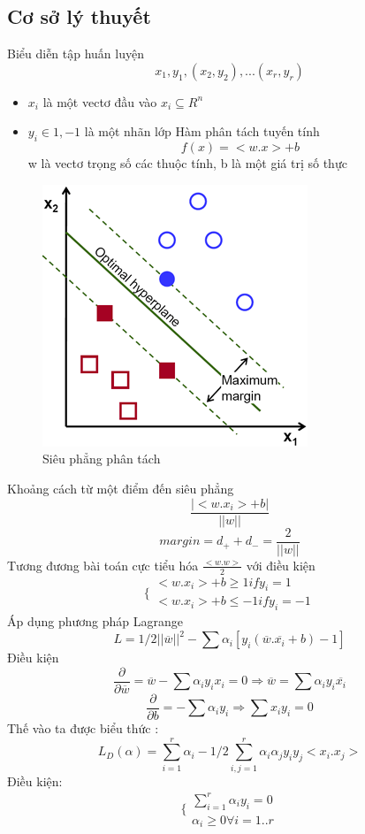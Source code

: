 \documentclass[a4paper,12pt]{report}
\begin{document}
\subsection{Cơ sở lý thuyết}
Biểu diễn tập huấn luyện 
$${x_1, y_1}, (x_2,y_2),...(x_r,y_r)$$
\begin{itemize}
\item $x_i$ là một vectơ đầu vào $x_i \subseteq R^n$
\item $y_i\in{1,-1}$ là một nhãn lớp
Hàm phân tách tuyến tính 
$$f(x)=<w.x> +b$$
w là vectơ trọng số các thuộc tính, b là một giá trị số thực\\


\end{itemize}
\begin{figure}[H]
\centering
\includegraphics[scale=3.0]{margin-svm.png}
\caption{Siêu phẳng phân tách}
\label{fig:margin-svm}
\end{figure}
Khoảng cách từ một điểm đến siêu phẳng 
$$\frac{|<w.x_i>+b|}{||w||} $$
$$margin=d_+ +d_-=\frac{2}{||w||}$$ 
Tương đương bài toán cực tiểu hóa $\frac{<w.w>}{2}$ với điều kiện 
$$ \lbrace\begin{array}{l}
 <w.x_i>+b \geq 1 if y_i=1\\ <w.x_i>+b
    \leq -1  if y_i=-1 \end{array} $$
Áp dụng phương pháp Lagrange  
$$ L= 1/2 ||\overline{w}||^2 -\sum\alpha_i[y_i(\overline{w}.\overline{x_i} +b)-1] $$
Điều kiện 
$$ \frac{ \partial}{\partial\overline{w}}
=\overline{w}- \sum \alpha_i y_i x_i=0 \Longrightarrow \overline{w}=\sum \alpha_i y_i \overline{x_i} $$
$$\frac{ \partial}{\partial b}=-\sum \alpha_i y_i \Longrightarrow \sum x_i y_i=0$$ 
Thế vào ta được biểu thức :
$$L_D(\alpha)=\sum_{i=1}^r \alpha_i-1/2 \sum_{i,j=1}^{r}\alpha_i \alpha_j y_i y_j<x_i.x_j> $$
Điều kiện:
$$\{ \begin{array}{l}
\sum_{i=1 } ^{r} \alpha_i y_i =0 \\
\alpha_i \geq 0 \forall i=1..r
\end{array}
$$
\end{document}
